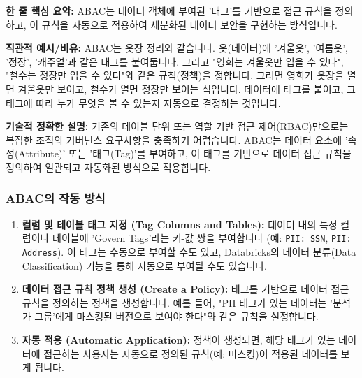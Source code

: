 \documentclass[11pt,a4paper]{article}
\theoremstyle{definition}
\begin{document}
\begin{keyconceptbox}
\textbf{한 줄 핵심 요약:} ABAC는 데이터 객체에 부여된 '태그'를 기반으로 접근 규칙을 정의하고, 이 규칙을 자동으로 적용하여 세분화된 데이터 보안을 구현하는 방식입니다.
\end{keyconceptbox}

\textbf{직관적 예시/비유:}
ABAC는 옷장 정리와 같습니다. 옷(데이터)에 '겨울옷', '여름옷', '정장', '캐주얼'과 같은 태그를 붙여둡니다. 그리고 "영희는 겨울옷만 입을 수 있다", "철수는 정장만 입을 수 있다"와 같은 규칙(정책)을 정합니다. 그러면 영희가 옷장을 열면 겨울옷만 보이고, 철수가 열면 정장만 보이는 식입니다. 데이터에 태그를 붙이고, 그 태그에 따라 누가 무엇을 볼 수 있는지 자동으로 결정하는 것입니다.

\textbf{기술적 정확한 설명:}
기존의 테이블 단위 또는 역할 기반 접근 제어(RBAC)만으로는 복잡한 조직의 거버넌스 요구사항을 충족하기 어렵습니다. ABAC는 데이터 요소에 '속성(Attribute)' 또는 '태그(Tag)'를 부여하고, 이 태그를 기반으로 데이터 접근 규칙을 정의하여 일관되고 자동화된 방식으로 적용합니다.

\subsubsection*{ABAC의 작동 방식}
\begin{enumerate}
    \item \textbf{컬럼 및 테이블 태그 지정 (Tag Columns and Tables):}
    데이터 내의 특정 컬럼이나 테이블에 'Govern Tags'라는 키-값 쌍을 부여합니다 (예: \texttt{PII: SSN}, \texttt{PII: Address}). 이 태그는 수동으로 부여할 수도 있고, Databricks의 데이터 분류(Data Classification) 기능을 통해 자동으로 부여될 수도 있습니다.
    \item \textbf{데이터 접근 규칙 정책 생성 (Create a Policy):}
    태그를 기반으로 데이터 접근 규칙을 정의하는 정책을 생성합니다. 예를 들어, "PII 태그가 있는 데이터는 '분석가 그룹'에게 마스킹된 버전으로 보여야 한다"와 같은 규칙을 설정합니다.
    \item \textbf{자동 적용 (Automatic Application):}
    정책이 생성되면, 해당 태그가 있는 데이터에 접근하는 사용자는 자동으로 정의된 규칙(예: 마스킹)이 적용된 데이터를 보게 됩니다.
\end{enumerate}
\end{document}
